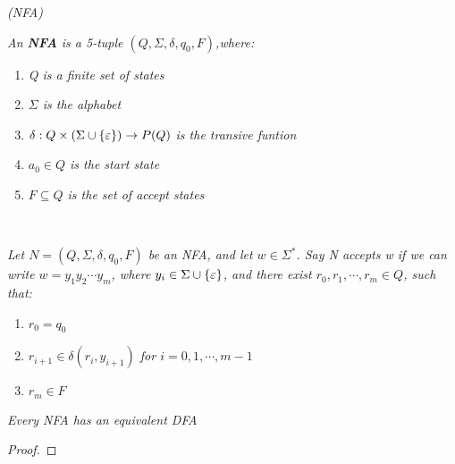 \documentclass{article}
\begin{document}
\begin{defn}
    \textit{(NFA)}

    \textit{An \textbf{NFA} is a 5-tuple $(Q,\Sigma,\delta,q_0,F)$,where:}

    \begin{enumerate}
        \item \textit{Q is a finite set of states}
        \item \textit{$\Sigma$ is the alphabet}
        \item \textit{$\delta: Q\times(\Sigma\cup\{\varepsilon\})\rightarrow P(Q)$ is the transive funtion}
        \item \textit{$a_0 \in Q$ is the start state}
        \item \textit{$F \subseteq Q$ is the set of accept states}
    \end{enumerate}
\end{defn}

\begin{defn}
    \

    \textit{Let $N = (Q,\Sigma,\delta,q_0,F)$ be an NFA, and let $w\in \Sigma ^*$. Say N accepts w if we can write $w = y_1y_2\cdots y_m$, where $y_i\in \Sigma\cup\{\varepsilon\}$, and there exist $r_0,r_1,\cdots,r_m\in Q$, such that:}

    \begin{enumerate}
        \item $r_0 = q_0$
        \item \textit{$r_{i+1} \in \delta(r_i,y_{i+1})$ for $i = 0,1,\cdots,m-1$}
        \item $r_m\in F$
    \end{enumerate}
\end{defn}

\begin{thm}
    \textit{Every NFA has  an equivalent DFA}

    \begin{proof}
        
    \end{proof}
\end{thm}
\ifx\allfiles\undefined
\end{document}
